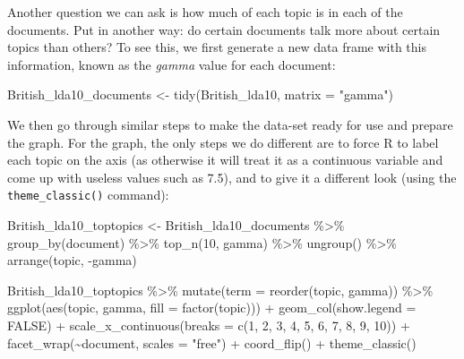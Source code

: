\documentclass[
]{book}
\newenvironment{Shaded}{\begin{snugshade}}{\end{snugshade}}
\newcommand{\AttributeTok}[1]{\textcolor[rgb]{0.77,0.63,0.00}{#1}}
\newcommand{\ConstantTok}[1]{\textcolor[rgb]{0.00,0.00,0.00}{#1}}
\newcommand{\DecValTok}[1]{\textcolor[rgb]{0.00,0.00,0.81}{#1}}
\newcommand{\FunctionTok}[1]{\textcolor[rgb]{0.00,0.00,0.00}{#1}}
\newcommand{\NormalTok}[1]{#1}
\newcommand{\OtherTok}[1]{\textcolor[rgb]{0.56,0.35,0.01}{#1}}
\newcommand{\SpecialCharTok}[1]{\textcolor[rgb]{0.00,0.00,0.00}{#1}}
\newcommand{\StringTok}[1]{\textcolor[rgb]{0.31,0.60,0.02}{#1}}
\begin{document}
Another question we can ask is how much of each topic is in each of the documents. Put in another way: do certain documents talk more about certain topics than others? To see this, we first generate a new data frame with this information, known as the \emph{gamma} value for each document:

\begin{Shaded}
\begin{Highlighting}[]
\NormalTok{British\_lda10\_documents }\OtherTok{\textless{}{-}} \FunctionTok{tidy}\NormalTok{(British\_lda10, }\AttributeTok{matrix =} \StringTok{"gamma"}\NormalTok{)}
\end{Highlighting}
\end{Shaded}

We then go through similar steps to make the data-set ready for use and prepare the graph. For the graph, the only steps we do different are to force R to label each topic on the axis (as otherwise it will treat it as a continuous variable and come up with useless values such as 7.5), and to give it a different look (using the \texttt{theme\_classic()} command):

\begin{Shaded}
\begin{Highlighting}[]
\NormalTok{British\_lda10\_toptopics }\OtherTok{\textless{}{-}}\NormalTok{ British\_lda10\_documents }\SpecialCharTok{\%\textgreater{}\%} \FunctionTok{group\_by}\NormalTok{(document) }\SpecialCharTok{\%\textgreater{}\%} 
    \FunctionTok{top\_n}\NormalTok{(}\DecValTok{10}\NormalTok{, gamma) }\SpecialCharTok{\%\textgreater{}\%} \FunctionTok{ungroup}\NormalTok{() }\SpecialCharTok{\%\textgreater{}\%} \FunctionTok{arrange}\NormalTok{(topic, }\SpecialCharTok{{-}}\NormalTok{gamma)}

\NormalTok{British\_lda10\_toptopics }\SpecialCharTok{\%\textgreater{}\%} \FunctionTok{mutate}\NormalTok{(}\AttributeTok{term =} \FunctionTok{reorder}\NormalTok{(topic, gamma)) }\SpecialCharTok{\%\textgreater{}\%} 
    \FunctionTok{ggplot}\NormalTok{(}\FunctionTok{aes}\NormalTok{(topic, gamma, }\AttributeTok{fill =} \FunctionTok{factor}\NormalTok{(topic))) }\SpecialCharTok{+} \FunctionTok{geom\_col}\NormalTok{(}\AttributeTok{show.legend =} \ConstantTok{FALSE}\NormalTok{) }\SpecialCharTok{+} 
    \FunctionTok{scale\_x\_continuous}\NormalTok{(}\AttributeTok{breaks =} \FunctionTok{c}\NormalTok{(}\DecValTok{1}\NormalTok{, }\DecValTok{2}\NormalTok{, }\DecValTok{3}\NormalTok{, }\DecValTok{4}\NormalTok{, }\DecValTok{5}\NormalTok{, }\DecValTok{6}\NormalTok{, }\DecValTok{7}\NormalTok{, }\DecValTok{8}\NormalTok{, }\DecValTok{9}\NormalTok{, }
        \DecValTok{10}\NormalTok{)) }\SpecialCharTok{+} \FunctionTok{facet\_wrap}\NormalTok{(}\SpecialCharTok{\textasciitilde{}}\NormalTok{document, }\AttributeTok{scales =} \StringTok{"free"}\NormalTok{) }\SpecialCharTok{+} \FunctionTok{coord\_flip}\NormalTok{() }\SpecialCharTok{+} 
    \FunctionTok{theme\_classic}\NormalTok{()}
\end{Highlighting}
\end{Shaded}
\end{document}
